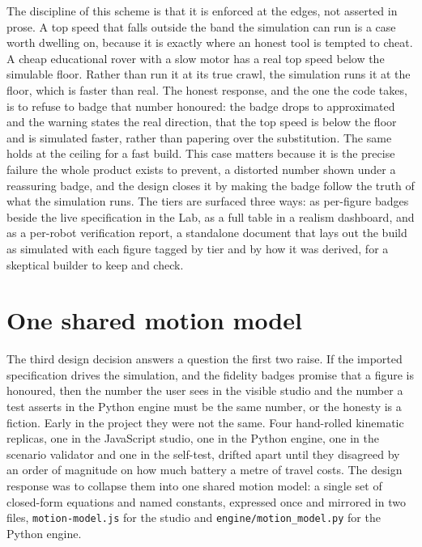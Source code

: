 \documentclass[11pt,a4paper]{report}
\begin{document}
The discipline of this scheme is that it is enforced at the edges, not asserted in prose. A top speed that falls outside the band the simulation can run is a case worth dwelling on, because it is exactly where an honest tool is tempted to cheat. A cheap educational rover with a slow motor has a real top speed below the simulable floor. Rather than run it at its true crawl, the simulation runs it at the floor, which is faster than real. The honest response, and the one the code takes, is to refuse to badge that number honoured: the badge drops to approximated and the warning states the real direction, that the top speed is below the floor and is simulated faster, rather than papering over the substitution. The same holds at the ceiling for a fast build. This case matters because it is the precise failure the whole product exists to prevent, a distorted number shown under a reassuring badge, and the design closes it by making the badge follow the truth of what the simulation runs. The tiers are surfaced three ways: as per-figure badges beside the live specification in the Lab, as a full table in a realism dashboard, and as a per-robot verification report, a standalone document that lays out the build as simulated with each figure tagged by tier and by how it was derived, for a skeptical builder to keep and check.

\section{One shared motion model}
\label{sec:shared-motion}
The third design decision answers a question the first two raise. If the imported specification drives the simulation, and the fidelity badges promise that a figure is honoured, then the number the user sees in the visible studio and the number a test asserts in the Python engine must be the same number, or the honesty is a fiction. Early in the project they were not the same. Four hand-rolled kinematic replicas, one in the JavaScript studio, one in the Python engine, one in the scenario validator and one in the self-test, drifted apart until they disagreed by an order of magnitude on how much battery a metre of travel costs. The design response was to collapse them into one shared motion model: a single set of closed-form equations and named constants, expressed once and mirrored in two files, \texttt{motion-model.js} for the studio and \texttt{engine/motion\_model.py} for the Python engine.
\end{document}
